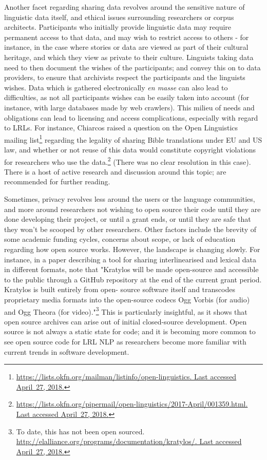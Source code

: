 Another facet regarding sharing data revolves around the sensitive nature of linguistic data itself, and ethical issues surrounding researchers or corpus architects. Participants who initially provide linguistic data may require permanent access to that data, and may wish to restrict access to others - for instance, in the case where stories or data are viewed as part of their cultural heritage, and which they view as private to their culture. Linguists taking data need to then document the wishes of the participants; and convey this on to data providers, to ensure that archivists respect the participants and the linguists wishes. Data which is gathered electronically {\it en masse} can  also lead to difficulties, as not all participants wishes can be easily taken into account (for instance, with large databases made by web crawlers). This milieu of needs and obligations can lead to licensing and access complications, especially with regard to LRLs. For instance, Chiarcos raised a question on the Open Linguistics mailing list\footnote{\href{https://lists.okfn.org/mailman/listinfo/open-linguistics}{https://lists.okfn.org/mailman/listinfo/open-linguistics. Last accessed April~27, 2018.}} regarding the legality of sharing Bible translations under EU and US law, and whether or not reuse of this data would constitute copyright violations for researchers who use the data.\footnote{\href{https://lists.okfn.org/pipermail/open-linguistics/2017-April/001359.html}{https://lists.okfn.org/pipermail/open-linguistics/2017-April/001359.html. Last accessed April~27, 2018.}} (There was no clear resolution in this case). There is a host of active research and discussion around this topic; \citet{liberman2000legal, newman2007copyright, rice2006ethical, austin2010communities, o2010ethical, cushman2013wampum} are recommended for further reading.

Sometimes, privacy revolves less around the users or the language communities, and more around researchers not wishing to open source their code until they are done developing their project, or until a grant ends, or until they are safe that they won't be scooped by other researchers. Other factors include the brevity of some academic funding cycles, concerns about scope, or lack of education regarding how open source works. However, the landscape is changing slowly. For instance, in a paper describing a tool for sharing interlinearised and lexical data in different formats, \citet[132]{kaufman2018kratylos} note that "Kratylos will be made open-source and accessible to the public through a GitHub repository at the end of the current grant period. Kratylos is built entirely from open- source software itself and transcodes proprietary media formats into the open-source codecs Ogg Vorbis (for audio) and Ogg Theora (for video)."\footnote{To date, this has not been open sourced. \href{http://elalliance.org/programs/documentation/kratylos/}{http://elalliance.org/programs/documentation/kratylos/. Last accessed April~27, 2018.}} This is particularly insightful, as it shows that open source archives can arise out of initial closed-source development. Open source is not always a static state for code; and it is becoming more common to see open source code for LRL NLP as researchers become more familiar with current trends in software development.

